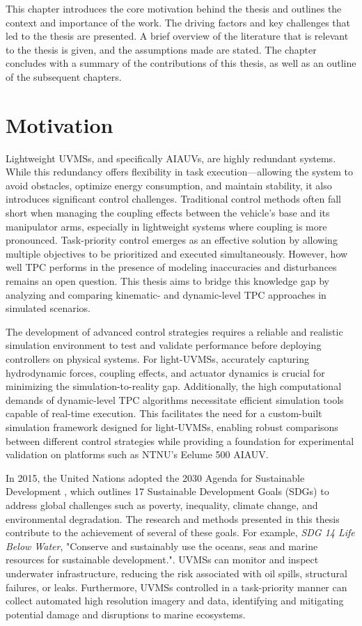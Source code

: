 This chapter introduces the core motivation behind the thesis and outlines the
context and importance of the work. The driving factors and key challenges that
led to the thesis are presented. A brief overview of the literature that is
relevant to the thesis is given, and the assumptions made are
stated. The chapter concludes with a summary of the contributions of this thesis,
as well as an outline of the subsequent chapters.


\section{Motivation}

Lightweight UVMSs, and specifically AIAUVs, are highly redundant systems.
While this redundancy offers flexibility in task execution—allowing the system
to avoid obstacles, optimize 
energy consumption, and maintain stability, it also introduces significant 
control challenges. Traditional control methods often fall short when managing 
the coupling effects between the vehicle's base and its manipulator arms, 
especially in lightweight systems where coupling is more pronounced. 
Task-priority control emerges as an effective solution by allowing 
multiple objectives to be prioritized and executed simultaneously. However, how 
well TPC performs in the presence of modeling inaccuracies and disturbances 
remains an open question. This thesis aims to bridge this knowledge gap by 
analyzing and comparing kinematic- and dynamic-level TPC approaches in
simulated scenarios.

The development of advanced control strategies requires a reliable and 
realistic simulation environment to test and validate performance before 
deploying controllers on physical systems. For light-UVMSs, accurately 
capturing hydrodynamic forces, coupling effects, and actuator dynamics is 
crucial for minimizing the simulation-to-reality gap. Additionally, the high 
computational demands of dynamic-level TPC algorithms necessitate efficient 
simulation tools capable of real-time execution. This facilitates the
need for a custom-built simulation framework designed for light-UVMSs, 
enabling robust comparisons between different control strategies while 
providing a foundation for experimental validation on platforms such as NTNU’s 
Eelume 500 AIAUV.

In 2015, the United Nations adopted the 2030 Agenda for Sustainable Development
\cite{UN2030Agenda}, which outlines 17 Sustainable Development Goals (SDGs) to
address global challenges such as poverty, inequality, climate change, and
environmental degradation. The research and methods presented in this thesis
contribute to the achievement of several of these goals. For example, \emph{SDG 14
Life Below Water}, "Conserve and sustainably use the oceans, seas and marine
resources for sustainable development.". UVMSs can monitor and inspect underwater
infrastructure, reducing the risk associated with oil spills, structural failures,
or leaks. Furthermore, UVMSs controlled in a task-priority manner can collect automated
high resolution imagery and data, identifying and mitigating potential
damage and disruptions to marine ecosystems.

